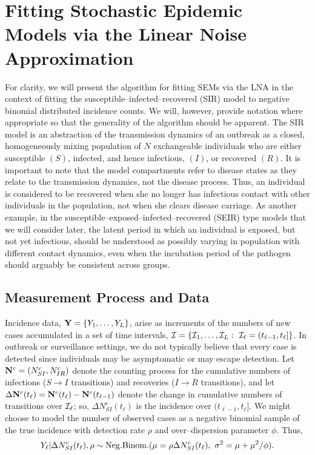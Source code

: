 \section{Fitting Stochastic Epidemic Models via the Linear Noise Approximation}
\label{sec:lna_methods}

For clarity, we will present the algorithm for fitting SEMs via the LNA in the context of fitting the susceptible--infected--recovered (SIR) model to negative binomial distributed incidence counts. We will, however, provide notation where appropriate so that the generality of the algorithm should be apparent. The SIR model is an abstraction of the transmission dynamics of an outbreak as a closed, homogeneously mixing population of $ N $ exchangeable individuals who are either susceptible $ (S) $, infected, and hence infectious, $ (I) $, or recovered $ (R) $. It is important to note that the model compartments refer to disease states as they relate to the transmission dynamics, not the disease process. Thus, an individual is considered to be recovered when she no longer has infectious contact with other individuals in the population, not when she clears disease carriage. As another example, in the susceptible--exposed--infected--recovered (SEIR) type models that we will consider later, the latent period in which an individual is exposed, but not yet infectious, should be understood as possibly varying in population with different contact dynamics, even when the incubation period of the pathogen should arguably be consistent across groups.

\subsection{Measurement Process and Data}
\label{subsec:lna_measproc}
Incidence data, $ \mathbf{Y} = \lbrace Y_1,\dots,Y_L\rbrace $,  arise as increments of the numbers of new cases accumulated in a set of time intervals, $ \mathcal{I} = \lbrace\mathcal{I}_1,\dots,\mathcal{I}_L:\ \mathcal{I}_\ell = (t_{\ell-1},t_\ell]\rbrace $. In outbreak or surveillance settings, we do not typically believe that every case is detected since individuals may be asymptomatic or may escape detection. Let $ \mathbf{N}^c = (N^c_{SI}, N^c_{IR}) $ denote the counting process for the cumulative numbers of infections ($ S\rightarrow I $ transitions) and recoveries ($ I\rightarrow R $ transitions), and let $ \Delta \mathbf{N}^c(t_\ell) = \mathbf{N}^c(t_\ell) - \mathbf{N}^c(t_{\ell-1})$ denote the change in cumulative numbers of transitions over $ \mathcal{I}_\ell $; so, $ \Delta N^c_{SI}(t_\ell)$ is the incidence over $ (t_{\ell-1},t_\ell] $. We might choose to model the number of observed cases as a negative binomial sample of the true incidence with detection rate $ \rho $ and over--dispersion parameter $ \phi $. Thus,
\begin{equation}
\label{eqn:incidence_emitprob}
Y_\ell|\Delta N^c_{SI}(t_\ell),\rho \sim \mathrm{Neg.Binom.}(\mathrm{\mu} = \rho\Delta N^c_{SI}(t_\ell),\ \sigma^2 = \mu + \mu^2/\phi).
\end{equation}

